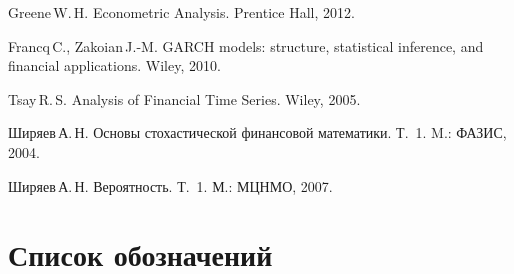 \documentclass[11pt]{book}
\theoremstyle{mythm}
\theoremstyle{mydef}
\theoremstyle{definition}
\begin{document}
\begin{thebibliography}{11}
Greene\,W.\,H. Econometric Analysis. Prentice Hall, 2012.

Francq\,C., Zakoian\,J.-M. GARCH models: structure, statistical inference, and financial applications. Wiley, 2010.

Tsay\,R.\,S. Analysis of Financial Time Series. Wiley, 2005.

Ширяев\,А.\,Н. Основы стохастической финансовой математики. Т.~1. M.: ФАЗИС, 2004.

Ширяев\,А.\,Н. Вероятность. Т. \,1. М.: МЦНМО, 2007.
\end{thebibliography}

\printindex

\chapter*{Список обозначений}

\tableofcontents
\end{document}
